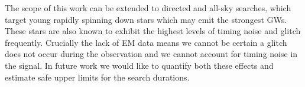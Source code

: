 \documentclass[../full_thesis/full_thesis.tex]{subfiles}
\begin{document}
The scope of this work can be extended to  directed and all-sky searches, which
target young rapidly spinning down stars which may emit the strongest GWs.
These stars are also known to exhibit the highest levels of timing noise and
glitch frequently. Crucially the lack of EM data means we cannot be certain a
glitch does not occur during the observation and we cannot account for timing
noise in the signal.  In future work we would like to quantify both these
effects and estimate safe upper limits for the search durations.


\biblio
\end{document}
